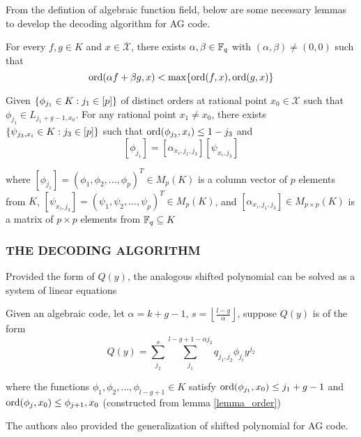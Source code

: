 \documentclass{article}
\begin{document}
From the defintion of algebraic function field, below are some necessary lemmas to develop the decoding algorithm for AG code.

\begin{lemma}
    \label{lemma_order}
    For every $f, g \in K$ and $x \in \overline{\mathcal{X}}$, there exists $\alpha, \beta \in \mathbb{F}_q$ with $(\alpha, \beta) \neq (0, 0)$ such that
    $$
        \operatorname{ord}(\alpha f + \beta g, x) < \max \{\operatorname{ord}(f, x), \operatorname{ord}(g, x)\}
    $$
\end{lemma}

\begin{lemma}
    \label{lemma_phi_psi}
    Given $\{\phi_{j_1} \in K: j_1 \in [p]\}$ of distinct orders at rational point $x_0 \in \mathcal{X}$ such that $\phi_{j_1} \in L_{j_1 + g - 1, x_0}$. For any rational point $x_1 \neq x_0$, there exists $\{\psi_{j_3, x_i} \in K: j_3 \in [p]\}$ such that $\operatorname{ord}(\phi_{j_3}, x_i) \leq 1 - j_3$ and
    $$
        [\phi_{j_1}] = [\alpha_{x_i, j_1, j_3}] [\psi_{x_i, j_3}]
    $$

    where $[\phi_{j_1}] = (\phi_1, \phi_2, ..., \phi_p)^T \in M_p(K)$ is a column vector of $p$ elements from $K$, $[\psi_{x_i, j_3}] = (\psi_1, \psi_2, ..., \psi_p)^T \in M_p(K)$, and $[\alpha_{x_i, j_1, j_3}] \in M_{p \times p}(K)$ is a matrix of $p \times p$ elements from $\mathbb{F}_q \subseteq K$
\end{lemma}

\subsubsection{THE DECODING ALGORITHM}

Provided the form of $Q(y)$, the analogous shifted polynomial can be solved as a system of linear equations

\begin{assumption}[shape of $Q(y)$]
    \label{assumption_shape_of_q}
    Given an algebraic code, let $\alpha = k + g - 1$, $s = \left\lfloor \frac{l - g}{\alpha}\right\rfloor$, suppose $Q(y)$ is of the form
    $$
        Q(y) = \sum_{j_2}^s \sum_{j_1}^{l-g+1 - \alpha j_2} q_{j_1, j_2} \phi_{j_i} y^{j_2}
    $$

    where the functions $\phi_1, \phi_2, ..., \phi_{l - g + 1} \in K$ satisfy $\operatorname{ord}(\phi_{j_1}, x_0) \leq j_1 + g - 1$ and $\operatorname{ord}(\phi_j, x_0) \leq \phi_{j+1}, x_0$ (constructed from lemma \ref{lemma_order})
\end{assumption}

The authors also provided the generalization of shifted polynomial for AG code.
\end{document}
